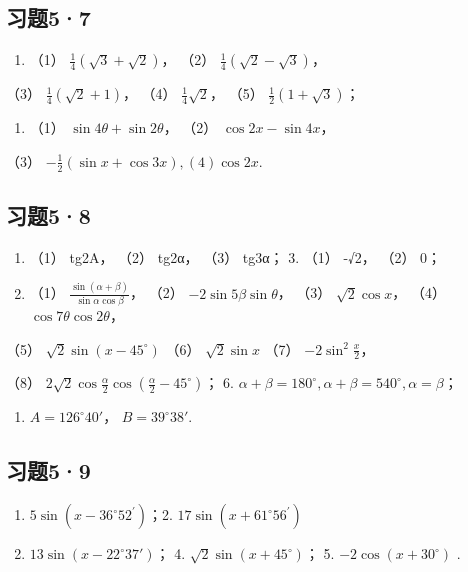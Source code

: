 \subsection{习题5·7}

\begin{enumerate}
\item
  （1） \(\frac{1}{4} (\sqrt{3} + \sqrt{2})\)， （2）
  \(\frac{1}{4} (\sqrt{2} - \sqrt{3})\)，
\end{enumerate}

（3） \(\frac{1}{4} (\sqrt{2} + 1)\)， （4） \(\frac{1}{4} \sqrt{2}\)，
（5） \(\frac{1}{2} (1 + \sqrt{3})\)；

\begin{enumerate}[start=3]
\item
  （1） \(\sin 4\theta + \sin 2\theta\)， （2） \(\cos 2x - \sin 4x\)，
\end{enumerate}

（3） \(-\frac{1}{2} (\sin x + \cos 3x), (4) \cos 2x.\)

\subsection{习题5·8}

\begin{enumerate}
\item
  （1） tg2A， （2） tg2α， （3） tg3α； 3. （1） -√2， （2） 0；
\item
  （1） \(\frac{\sin(\alpha + \beta)}{\sin\alpha\cos\beta}\)， （2）
  \(-2\sin 5\beta \sin \theta\)， （3） \(\sqrt{2}\cos x\)， （4）
  \(\cos 7\theta \cos 2\theta\)，
\end{enumerate}

（5） \(\sqrt{2}\sin (x - 45^{\circ})\) （6） \(\sqrt{2}\sin x\) （7）
\(-2\sin^{2}\frac{x}{2}\)，

（8）
\(2\sqrt{2}\cos \frac{\alpha}{2}\cos \left(\frac{\alpha}{2} - 45^{\circ}\right)\)；
6.
\(\alpha + \beta = 180^{\circ}, \alpha + \beta = 540^{\circ}, \alpha = \beta\)；

\begin{enumerate}[start=9]
\item
  \(A = 126^{\circ}40'\)， \(B = 39^{\circ}38'\).
\end{enumerate}

\subsection{习题5·9}

\begin{enumerate}
\item
  \(5\sin (x - 36^{\circ}52^{\prime})\)；2.
  \(17\sin (x + 61^{\circ}56^{\prime})\)
\item
  \(13 \sin(x - 22^{\circ}37')\)； 4.
  \(\sqrt{2} \sin(x + 45^{\circ})\)； 5. \(-2 \cos(x + 30^{\circ})\) .
\end{enumerate}

